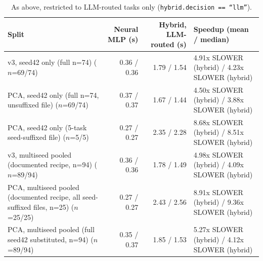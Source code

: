 \begin{table}[h]
\centering
\caption{As above, restricted to LLM-routed tasks only (\texttt{hybrid.decision == ``llm''}).}
\label{tab:timing_llm_routed}
\begin{tabular}{lrrl}
\toprule
Split & Neural MLP (s) & Hybrid, LLM-routed (s) & Speedup (mean / median) \\
\midrule
v3, seed42 only (full n=74) ($n$=69/74) & 0.36 / 0.36 & 1.79 / 1.54 & 4.91x SLOWER (hybrid) / 4.23x SLOWER (hybrid) \\
PCA, seed42 only (full n=74, unsuffixed file) ($n$=69/74) & 0.37 / 0.37 & 1.67 / 1.44 & 4.50x SLOWER (hybrid) / 3.88x SLOWER (hybrid) \\
PCA, seed42 only (5-task seed-suffixed file) ($n$=5/5) & 0.27 / 0.27 & 2.35 / 2.28 & 8.68x SLOWER (hybrid) / 8.51x SLOWER (hybrid) \\
v3, multiseed pooled (documented recipe, n=94) ($n$=89/94) & 0.36 / 0.36 & 1.78 / 1.49 & 4.98x SLOWER (hybrid) / 4.09x SLOWER (hybrid) \\
PCA, multiseed pooled (documented recipe, all seed-suffixed files, n=25) ($n$=25/25) & 0.27 / 0.27 & 2.43 / 2.56 & 8.91x SLOWER (hybrid) / 9.36x SLOWER (hybrid) \\
PCA, multiseed pooled (full seed42 substituted, n=94) ($n$=89/94) & 0.35 / 0.37 & 1.85 / 1.53 & 5.27x SLOWER (hybrid) / 4.12x SLOWER (hybrid) \\
\bottomrule
\end{tabular}
\end{table}

